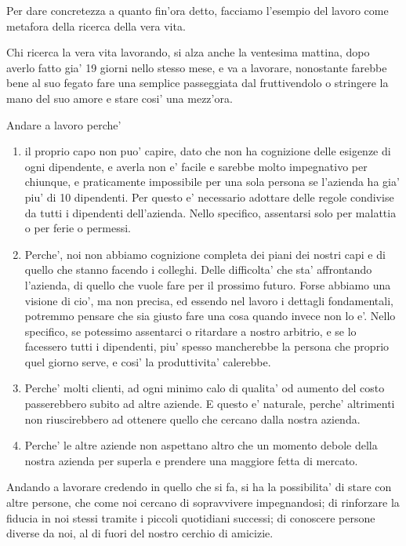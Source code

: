 Per dare concretezza a quanto fin'ora detto, facciamo l'esempio del lavoro come metafora della ricerca della vera vita.

Chi ricerca la vera vita lavorando, si alza anche la ventesima mattina, dopo averlo fatto gia' 19 giorni nello stesso mese, e va a lavorare, nonostante farebbe bene al suo fegato fare una semplice passeggiata dal fruttivendolo o
stringere la mano del suo amore e stare cosi' una mezz'ora.

Andare a lavoro perche' 
\begin{enumerate}
    \item il proprio capo non puo' capire, dato che non ha cognizione delle esigenze di ogni dipendente, e averla non e' facile e sarebbe molto impegnativo per chiunque, e praticamente impossibile per una sola persona se l'azienda ha gia' piu' di 10 dipendenti.
        Per questo e' necessario adottare delle regole condivise da tutti i dipendenti dell'azienda. Nello specifico, assentarsi solo per malattia o per ferie o permessi.
    \item Perche', noi non abbiamo cognizione completa dei piani dei nostri capi e di quello che stanno facendo i colleghi. Delle difficolta' che sta' affrontando l'azienda, di quello che vuole fare per il prossimo futuro.
   Forse abbiamo una visione di cio', ma non precisa, ed essendo nel lavoro i dettagli fondamentali, potremmo pensare che sia giusto fare una cosa quando invece non lo e'. Nello specifico, se potessimo assentarci o ritardare a nostro arbitrio, e se lo facessero tutti i dipendenti, piu' spesso mancherebbe la persona che proprio quel giorno serve, e cosi' la produttivita' calerebbe.
    \item Perche' molti clienti, ad ogni minimo calo di qualita' od aumento del costo passerebbero subito ad altre aziende. E questo e' naturale, perche' altrimenti non riuscirebbero ad ottenere quello che cercano dalla nostra azienda.
    \item Perche' le altre aziende non aspettano altro che un momento debole della nostra azienda per superla e prendere una maggiore fetta di mercato.

\end{enumerate}
Andando a lavorare credendo in quello che si fa, si ha la possibilita' di stare con altre persone, che come noi cercano di sopravvivere impegnandosi; di rinforzare la fiducia in noi stessi tramite i piccoli quotidiani successi; di conoscere persone diverse da noi, al di fuori del nostro cerchio di amicizie.

